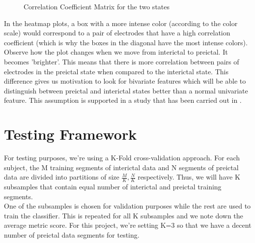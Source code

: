 \documentclass[a4paper]{article}
\begin{document}
\begin{figure}[H]
    \centering
    \qquad
    \caption{Correlation Coefficient Matrix for the two states}%
    \label{fig:corrMatrix}%
\end{figure}

In the heatmap plots, a box with a more intense color (according to the color scale) would correspond to a pair of electrodes that have a high correlation coefficient (which is why the boxes in the diagonal have the most intense colors). Observe how the plot changes when we move from interictal to preictal. It becomes 'brighter'.  This means that there is more correlation between pairs of electrodes in the preictal state when compared to the interictal state. This difference gives us motivation to look for bivariate features which will be able to distinguish between preictal and interictal states better than a normal univariate feature. This assumption is supported in a study that has been carried out in \cite{lecun}.

\section{Testing Framework}
For testing purposes, we're using a K-Fold cross-validation approach. For each subject, the M training segments of interictal data and N segments of preictal data are divided into partitions of size $\frac{M}{K}, \frac{N}{K}$ respectively. Thus, we will have K subsamples that contain equal number of interictal and preictal training segments. \\
One of the subsamples is chosen for validation purposes while the rest are used to train the classifier. This is repeated for all K subsamples and we note down the average metric score. For this project, we're setting K=3 so that we have a decent number of preictal data segments for testing. 
\end{document}
